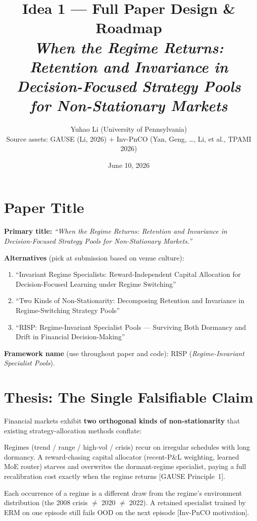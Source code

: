 \documentclass[11pt]{article}
\title{\textbf{Idea 1 --- Full Paper Design \& Roadmap}\\[4pt]
\large \emph{When the Regime Returns: Retention and Invariance in\\ Decision-Focused Strategy Pools for Non-Stationary Markets}}
\author{Yuhao Li (University of Pennsylvania)\\
\small Source assets: GAUSE (Li, 2026) $+$ Inv-PnCO (Yan, Geng, \dots, Li, et al., TPAMI 2026)}
\date{June 10, 2026}
\newcommand{\risp}{\textsc{RISP}}
\begin{document}
\maketitle

\section{Paper Title}
\textbf{Primary title:} \emph{``When the Regime Returns: Retention and Invariance in Decision-Focused Strategy Pools for Non-Stationary Markets.''}

\medskip\noindent\textbf{Alternatives} (pick at submission based on venue culture):
\begin{enumerate}[label=(\alph*)]
  \item ``Invariant Regime Specialists: Reward-Independent Capital Allocation for Decision-Focused Learning under Regime Switching''
  \item ``Two Kinds of Non-Stationarity: Decomposing Retention and Invariance in Regime-Switching Strategy Pools''
  \item ``\risp: Regime-Invariant Specialist Pools --- Surviving Both Dormancy and Drift in Financial Decision-Making''
\end{enumerate}
\textbf{Framework name} (use throughout paper and code): \risp{} (\emph{Regime-Invariant Specialist Pools}).

\section{Thesis: The Single Falsifiable Claim}
Financial markets exhibit \textbf{two orthogonal kinds of non-stationarity} that existing strategy-allocation methods conflate:
\begin{description}[leftmargin=1.6em]
  \item[(N1) Between-regime switching.] Regimes (trend / range / high-vol / crisis) recur on irregular schedules with long dormancy. A reward-chasing capital allocator (recent-P\&L weighting, learned MoE router) starves and overwrites the dormant-regime specialist, paying a full recalibration cost exactly when the regime returns [GAUSE Principle~1].
  \item[(N2) Within-regime drift.] Each occurrence of a regime is a different draw from the regime's environment distribution (the 2008 crisis $\neq$ 2020 $\neq$ 2022). A retained specialist trained by ERM on one episode still fails OOD on the next episode [Inv-PnCO motivation].
\end{description}
\end{document}
